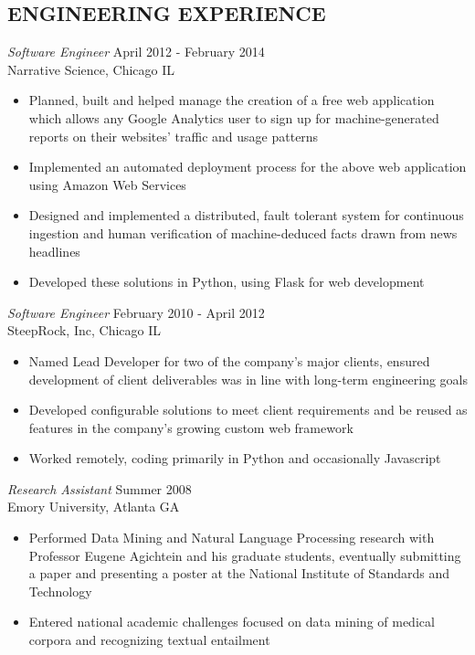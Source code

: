 \documentclass[line,margin]{res}
\begin{document}
\address{waltaskew@gmail.com}
\address{404-819-9796}

\begin{resume}
 
\section{ENGINEERING EXPERIENCE}
        {\sl Software Engineer} \hfill April 2012 - February 2014 \\
        Narrative Science, Chicago IL
        \begin{itemize} 
          \item Planned, built and helped manage the creation of a
            free web application which allows any Google Analytics
            user to sign up for machine-generated reports on their
            websites' traffic and usage patterns
          \item Implemented an automated deployment process for the
            above web application using Amazon Web Services
          \item Designed and implemented a distributed, fault tolerant
            system for continuous ingestion and human verification of
            machine-deduced facts drawn from news headlines
          \item Developed these solutions in Python, using Flask for
            web development
        \end{itemize}

        {\sl Software Engineer} \hfill February 2010 - April 2012 \\
        SteepRock, Inc, Chicago IL
        \begin{itemize}
        \item Named Lead Developer for two of the company's major
          clients, ensured development of client
          deliverables was in line with long-term engineering goals
        \item Developed configurable solutions to meet client
          requirements and be reused as features in the company's
          growing custom web framework
        \item Worked remotely, coding primarily in Python and
          occasionally Javascript
        \end{itemize}

        {\sl Research Assistant} \hfill Summer 2008 \\
        Emory University, Atlanta GA
        \begin{itemize}
        \item Performed Data Mining and Natural Language Processing research
          with Professor Eugene Agichtein and his graduate students,
          eventually submitting a paper and presenting a poster at the National
          Institute of Standards and Technology
        \item Entered national academic challenges focused on data
          mining of medical corpora and recognizing textual entailment
        \end{itemize}


\end{resume}
\end{document}
